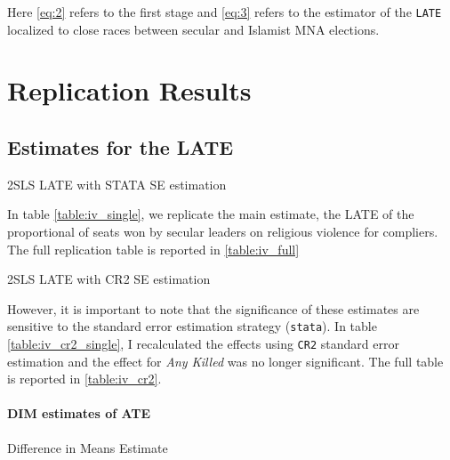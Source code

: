 \documentclass{scrartcl}
\begin{document}
Here \ref{eq:2} refers to the first stage and \ref{eq:3} refers to the estimator of the \texttt{LATE} localized to close races between secular and Islamist MNA elections.  

\section{Replication Results}
\subsection{Estimates for the LATE} \label{late_results}

\begin{table}[ht]
  \begin{center}
    \scalebox{0.75}{
      
    }
    \caption{2SLS LATE with STATA SE estimation}
    \label{table:iv_single}
  \end{center}
\end{table}

In table \ref{table:iv_single}, we replicate the main estimate, the LATE of the proportional of seats won by secular leaders on religious violence for compliers. The full replication table is reported in \ref{table:iv_full}

\begin{table}[h!]
  \begin{center}
    \scalebox{0.75}{
      
    }
    \caption{2SLS LATE with CR2 SE estimation}
    \label{table:iv_cr2_single}
  \end{center}
\end{table}

However, it is important to note that the significance of these estimates are sensitive to the standard error estimation strategy (\texttt{stata}).
In table \ref{table:iv_cr2_single}, I recalculated the effects using \texttt{CR2} standard error estimation and the effect for \textit{Any Killed} was no longer significant. The full table is reported in \ref{table:iv_cr2}.

\paragraph{DIM estimates of ATE}

\begin{table}[h!]
  \begin{center}
    \scalebox{0.75}{
      
    }
    \caption{Difference in Means Estimate}
    \label{table:dim}
  \end{center}
\end{table}
\end{document}
